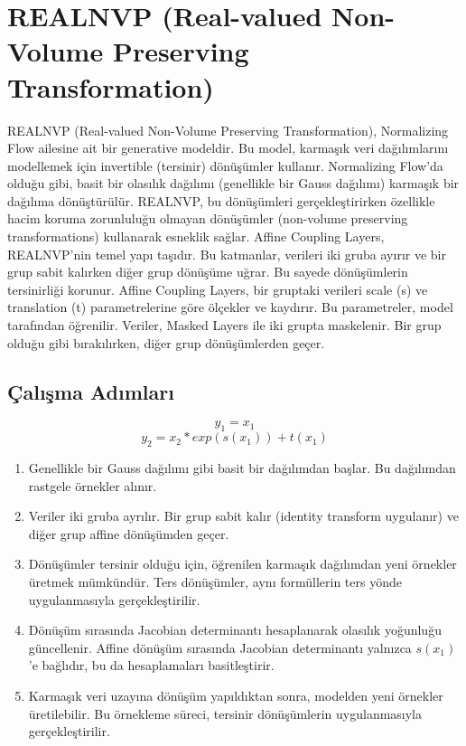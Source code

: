\section{REALNVP (Real-valued Non-Volume Preserving Transformation)}

REALNVP (Real-valued Non-Volume Preserving Transformation), Normalizing Flow ailesine ait bir generative modeldir. Bu model, karmaşık veri dağılımlarını modellemek için invertible (tersinir) dönüşümler kullanır. Normalizing Flow'da olduğu gibi, basit bir olasılık dağılımı (genellikle bir Gauss dağılımı) karmaşık bir dağılıma dönüştürülür. REALNVP, bu dönüşümleri gerçekleştirirken özellikle hacim koruma zorunluluğu olmayan dönüşümler (non-volume preserving transformations) kullanarak esneklik sağlar. Affine Coupling Layers, REALNVP'nin temel yapı taşıdır. Bu katmanlar, verileri iki gruba ayırır ve bir grup sabit kalırken diğer grup dönüşüme uğrar. Bu sayede dönüşümlerin tersinirliği korunur. Affine Coupling Layers, bir gruptaki verileri scale (s) ve translation (t) parametrelerine göre ölçekler ve kaydırır. Bu parametreler, model tarafından öğrenilir. Veriler, Masked Layers ile iki grupta maskelenir. Bir grup olduğu gibi bırakılırken, diğer grup dönüşümlerden geçer.

\subsection{Çalışma Adımları}

\[ y_1 = x_1 \]
\[ y_2 = x_2 * exp(s(x_1)) + t(x_1) \]

\begin{enumerate}
    \item Genellikle bir Gauss dağılımı gibi basit bir dağılımdan başlar. Bu dağılımdan rastgele örnekler alınır.
    \item Veriler iki gruba ayrılır. Bir grup sabit kalır (identity transform uygulanır) ve diğer grup affine dönüşümden geçer.
    \item Dönüşümler tersinir olduğu için, öğrenilen karmaşık dağılımdan yeni örnekler üretmek mümkündür. Ters dönüşümler, aynı formüllerin ters yönde uygulanmasıyla gerçekleştirilir.
    \item Dönüşüm sırasında Jacobian determinantı hesaplanarak olasılık yoğunluğu güncellenir. Affine dönüşüm sırasında Jacobian determinantı yalnızca $s(x_1)$'e bağlıdır, bu da hesaplamaları basitleştirir.
    \item Karmaşık veri uzayına dönüşüm yapıldıktan sonra, modelden yeni örnekler üretilebilir. Bu örnekleme süreci, tersinir dönüşümlerin uygulanmasıyla gerçekleştirilir.
\end{enumerate}



\newpage